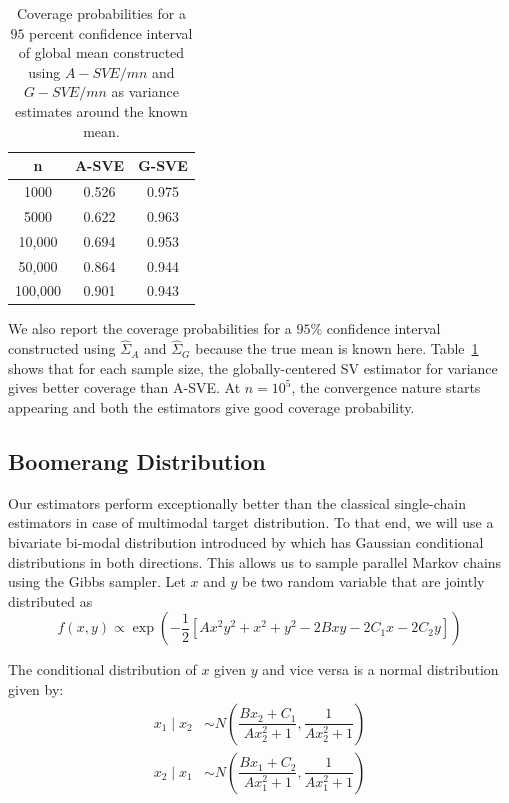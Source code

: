 \documentclass[11pt]{article}
\theoremstyle{remark}
\begin{document}
\begin{table}[h]
    \centering
    \begin{tabular}{|c|c|c|}
    n & A-SVE & G-SVE\\
    \hline
    1000 & 0.526 & 0.975\\
    5000 & 0.622 & 0.963\\
    10,000 & 0.694 & 0.953\\
    50,000 & 0.864 & 0.944\\
    100,000 & 0.901 & 0.943\\
    \end{tabular}
    \caption{Coverage probabilities for a $95$ percent confidence interval of global mean constructed using $A-SVE/mn$ and $G-SVE/mn$ as variance estimates around the known mean.}
    \label{tab:var-coverage}
\end{table}


We also report the coverage probabilities for a $95\%$ confidence interval constructed using $\hat{\Sigma}_A$ and $\hat{\Sigma}_G$ because the true mean is known here. Table~\ref{tab:var-coverage} shows that for each sample size, the globally-centered SV estimator for variance gives better coverage than A-SVE. At $n=10^5$, the convergence nature starts appearing and both the estimators give good coverage probability.


\subsection{Boomerang Distribution} \label{ex:boomerang}

Our estimators perform exceptionally better than the classical single-chain estimators in case of multimodal target distribution. To that end, we will use a bivariate bi-modal distribution introduced by \cite{gelman1991note} which has Gaussian conditional distributions in both directions. This allows us to sample parallel Markov chains using the Gibbs sampler. Let $x$ and $y$ be two random variable that are jointly distributed as 
%
\[
f(x, y) \propto \exp\left(-\dfrac{1}{2} \left[Ax^2y^2 + x^2 + y^2 -2Bxy  -2C_1x - 2C_2y  \right]\right)
\]

The conditional distribution of $x$ given $y$ and vice versa is a normal distribution given by:
%
\begin{align*}
    x_1 \mid x_2 &\sim N\left(\dfrac{Bx_2 + C_1}{Ax_2^2 + 1}, \dfrac{1}{Ax_2^2 + 1}\right)\\
    x_2 \mid x_1 &\sim N\left(\dfrac{Bx_1 + C_2}{Ax_1^2 + 1}, \dfrac{1}{Ax_1^2 + 1}\right)
\end{align*}
\end{document}
